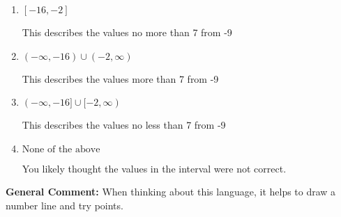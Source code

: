 \documentclass{extbook}[14pt]
\begin{document}
\begin{enumerate}
{\begin{enumerate}[label=\Alph*.]
This describes the values less than 7 from -9
\item \( [-16, -2] \)

This describes the values no more than 7 from -9
\item \( (-\infty, -16) \cup (-2, \infty) \)

This describes the values more than 7 from -9
\item \( (-\infty, -16] \cup [-2, \infty) \)

This describes the values no less than 7 from -9
\item \( \text{None of the above} \)

You likely thought the values in the interval were not correct.
\end{enumerate}

\textbf{General Comment:} When thinking about this language, it helps to draw a number line and try points.
}
\end{enumerate}
\end{document}
